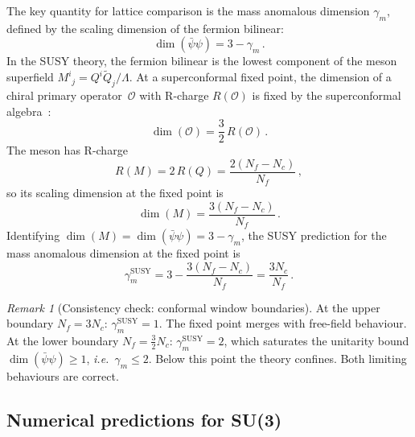 \documentclass[11pt,a4paper]{article}
\theoremstyle{plain}
\theoremstyle{definition}
\theoremstyle{remark}
\newtheorem{remark}[theorem]{Remark}
\newcommand{\Nc}{N_{\!c}}
\newcommand{\Nf}{N_{\!f}}
\newcommand{\ie}{\textit{i.e.}}
\begin{document}
The key quantity for lattice comparison is the mass anomalous dimension
$\gamma_m$, defined by the scaling dimension of the fermion bilinear:
\begin{equation}\label{eq:gamma-m-def}
  \dim(\bar\psi\psi) = 3 - \gamma_m\,.
\end{equation}
In the SUSY theory, the fermion bilinear is the lowest component of
the meson superfield $M^i{}_j = Q^i \widetilde{Q}_j / \Lambda$.  At a
superconformal fixed point, the dimension of a chiral primary
operator~$\mathcal{O}$ with R-charge $R(\mathcal{O})$ is fixed by the
superconformal algebra~\cite{Seiberg1995,IS1996}:
\begin{equation}\label{eq:dim-R}
  \dim(\mathcal{O}) = \frac{3}{2}\, R(\mathcal{O})\,.
\end{equation}
The meson has R-charge
\begin{equation}\label{eq:R-meson}
  R(M) = 2\,R(Q) = \frac{2(\Nf - \Nc)}{\Nf}\,,
\end{equation}
so its scaling dimension at the fixed point is
\begin{equation}\label{eq:dim-meson}
  \dim(M) = \frac{3(\Nf - \Nc)}{\Nf}\,.
\end{equation}
Identifying $\dim(M) = \dim(\bar\psi\psi) = 3 - \gamma_m$, the SUSY
prediction for the mass anomalous dimension at the fixed point is
\begin{equation}\label{eq:gamma-SUSY}
  \boxed{
    \gamma_m^{\mathrm{SUSY}} = 3 - \frac{3(\Nf - \Nc)}{\Nf}
    = \frac{3\Nc}{\Nf}\,.
  }
\end{equation}


\begin{remark}[Consistency check: conformal window boundaries]
  At the upper boundary $\Nf = 3\Nc$: $\gamma_m^{\mathrm{SUSY}} = 1$.
  The fixed point merges with free-field behaviour.  At the lower
  boundary $\Nf = \frac{3}{2}\Nc$:
  $\gamma_m^{\mathrm{SUSY}} = 2$, which saturates the unitarity bound
  $\dim(\bar\psi\psi) \geq 1$, \ie\ $\gamma_m \leq 2$.  Below this
  point the theory confines.  Both limiting behaviours are correct.
\end{remark}

\subsection{Numerical predictions for SU(3)}
\label{ssec:gamma-numerical}
\end{document}
